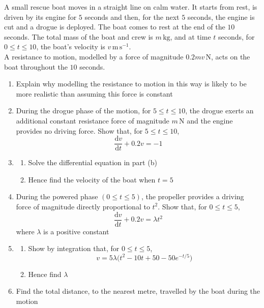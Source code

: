 \documentclass[leqno]{article}
\begin{document}
\begin{enumerate}[
  label=\textbf{\arabic*.},
  leftmargin=*,
  topsep=0pt,
  partopsep=0pt,
  parsep=0pt
]
A small rescue boat moves in a straight line on calm water. It starts from rest, is driven by its engine for $5$ seconds and then, for the next $5$ seconds, the engine is cut and a drogue is deployed. The boat comes to rest at the end of the $10$ seconds. The total mass of the boat and crew is $m\,\mathrm{kg}$, and at time $t$ seconds, for $0\le t\le 10$, the boat’s velocity is $v\,\mathrm{m\,s^{-1}}$. \\
A resistance to motion, modelled by a force of magnitude $0.2mv\,\mathrm{N}$, acts on the boat throughout the $10$ seconds. \\
\begin{enumerate}[label=\textbf{(\alph*)}]
  \item Explain why modelling the resistance to motion in this way is likely to be more realistic than assuming this force is constant  \\
  \item During the drogue phase of the motion, for $5\le t\le 10$, the drogue exerts an additional constant resistance force of magnitude $m\,\mathrm{N}$ and the engine provides no driving force. Show that, for $5\le t\le 10$,
  \[
  \frac{\mathrm{d}v}{\mathrm{d}t}+0.2v=-1
  \] 
  \item 
  \begin{enumerate}[label=(\roman*)]
    \item Solve the differential equation in part (b) 
    \item Hence find the velocity of the boat when $t=5$  \\
  \end{enumerate}
  \item During the powered phase $(0\le t\le 5)$, the propeller provides a driving force of magnitude directly proportional to $t^2$. Show that, for $0\le t\le 5$,
  \[
  \frac{\mathrm{d}v}{\mathrm{d}t}+0.2v=\lambda t^2
  \]
  where $\lambda$ is a positive constant 
  \item 
  \begin{enumerate}[label=(\roman*)]
    \item Show by integration that, for $0\le t\le 5$,
    \[
    v=5\lambda\bigl(t^2-10t+50-50e^{-t/5}\bigr)
    \] 
    \item Hence find $\lambda$  \\
  \end{enumerate}
  \item Find the total distance, to the nearest metre, travelled by the boat during the motion  \\
\end{enumerate}


\end{enumerate}
\end{document}
